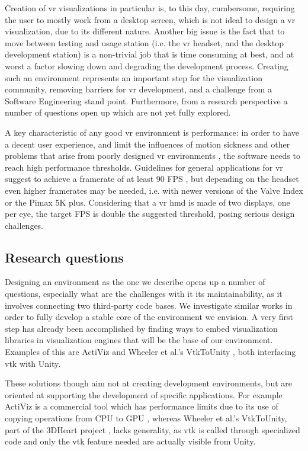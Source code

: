 Creation of \acrshort{vr} visualizations in particular is, to this day, cumbersome, requiring the user to mostly work from a desktop screen, which is not ideal to design a \acrshort{vr} visualization, due to its different nature. Another big issue is the fact that to move between testing and usage station (i.e. the \acrshort{vr} headset, and the desktop development station) is a non-trivial job that is time consuming at best, and at worst a factor slowing down and degrading the development process. Creating such an environment represents an important step for the visualization community, removing barriers for \acrshort{vr} development, and a challenge from a Software Engineering stand point. Furthermore, from a research perspective a number of questions open up which are not yet fully explored.

A key characteristic of any good \acrshort{vr} environment is performance: in order to have a decent user experience, and limit the influences of motion sickness and other problems that arise from poorly designed \acrshort{vr} environments \cite{viire1997health}, the software needs to reach high performance thresholds. Guidelines for general applications for \acrshort{vr} suggest to achieve a framerate of at least 90 FPS \cite{noauthor_vr_nodate-1}, but depending on the headset even higher framerates may be needed, i.e. with newer versions of the Valve Index or the Pimax 5K plus. Considering that a \acrshort{vr} \acrfull{hmd} is made of two displays, one per eye, the target FPS is double the suggested threshold, posing serious design challenges.

\subsection{Research questions}

Designing an environment as the one we describe opens up a number of questions, especially what are the challenges with it its maintainability, as it involves connecting two third-party code bases. We investigate similar works in order to fully develop a stable core of the environment we envision. A very first step has already been accomplished by finding ways to embed visualization libraries in visualization engines that will be the base of our environment. Examples of this are ActiViz \cite{kitware_activiz} and Wheeler et al.'s VtkToUnity \cite{wheeler_virtual_2018}, both interfacing \acrshort{vtk} with Unity.

These solutions though aim not at creating development environments, but are oriented at supporting the development of specific applications. For example ActiViz is a commercial tool which has performance limits due to its use of copying operations from CPU to GPU \cite{gregg2011data}, whereas Wheeler et al.'s VtkToUnity, part of the 3DHeart project \cite{wheeler_virtual_2018}, lacks generality, as \acrshort{vtk} is called through specialized code and only the \acrshort{vtk} feature needed are actually visible from Unity.

